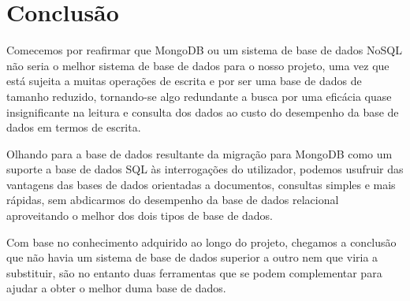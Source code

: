 \chapter{Conclusão}
Comecemos por reafirmar que MongoDB ou um sistema de base de dados NoSQL não seria o melhor sistema de base de dados para o nosso projeto, uma vez que está sujeita a muitas operações de escrita e por ser uma base de dados de tamanho reduzido, tornando-se algo redundante a busca por uma eficácia quase insignificante na leitura e consulta dos dados ao custo do desempenho da base de dados em termos de escrita.
\par Olhando para a base de dados resultante da migração para MongoDB como um suporte a base de dados SQL às interrogações do utilizador, podemos usufruir das vantagens das bases de dados orientadas a documentos, consultas simples e mais rápidas, sem abdicarmos do desempenho da base de dados relacional aproveitando o melhor dos dois tipos de base de dados.
\par Com base no conhecimento adquirido ao longo do projeto, chegamos a conclusão que não havia um sistema de base de dados superior a outro nem que viria a substituir, são no entanto duas ferramentas que se podem complementar para ajudar a obter o melhor duma base de dados.
